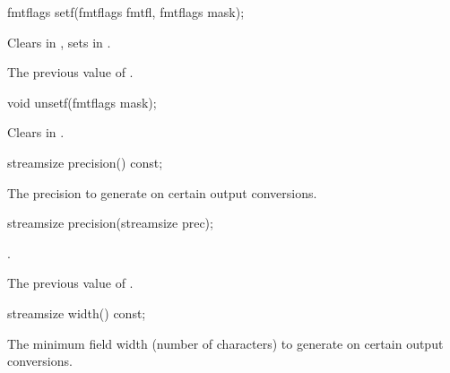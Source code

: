 %
%
\begin{itemdecl}
fmtflags setf(fmtflags fmtfl, fmtflags mask);
\end{itemdecl}

\begin{itemdescr}
\pnum
\effects
Clears  in
,
sets
in
.

\pnum
\returns
The previous value of
.
\end{itemdescr}

%
\begin{itemdecl}
void unsetf(fmtflags mask);
\end{itemdecl}

\begin{itemdescr}
\pnum
\effects
Clears  in
.
\end{itemdescr}

%
\begin{itemdecl}
streamsize precision() const;
\end{itemdecl}

\begin{itemdescr}
\pnum
\returns
The precision
to generate on certain output conversions.
\end{itemdescr}

%
%
\begin{itemdecl}
streamsize precision(streamsize prec);
\end{itemdecl}

\begin{itemdescr}
\pnum
\postcondition
{}.

\pnum
\returns
The previous value of
.
\end{itemdescr}

%
\begin{itemdecl}
streamsize width() const;
\end{itemdecl}

\begin{itemdescr}
\pnum
\returns
The minimum field width (number of characters) to generate on certain output
conversions.
\end{itemdescr}

